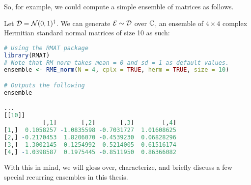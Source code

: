 So, for example, we could compute a simple ensemble of matrices as follows.

\begin{code}
Let $\mathcal{D} = \mathcal{N}(0,1)^{\dagger}$. We can generate $\mathcal{E} \sim \mathcal{D}$ over $\mathbb{C}$, an ensemble of $4 \times 4$ complex Hermitian standard normal matrices of size 10 as such:
\end{code}

\begin{lstlisting}[language=R]
# Using the RMAT package
library(RMAT)
# Note that RM_norm takes mean = 0 and sd = 1 as default values.
ensemble <- RME_norm(N = 4, cplx = TRUE, herm = TRUE, size = 10)

# Outputs the following
ensemble

...
[[10]]
           [,1]       [,2]       [,3]        [,4]
[1,]  0.1058257 -1.0835598 -0.7031727  1.01608625
[2,] -0.2170453  1.8206070 -0.4539230  0.06828296
[3,]  1.3002145  0.1254992 -0.5214005 -0.61516174
[4,] -1.0398587  0.1975445 -0.8511950  0.86366082
\end{lstlisting}

With this in mind, we will gloss over, characterize, and briefly discuss a few special recurring ensembles in this thesis.


